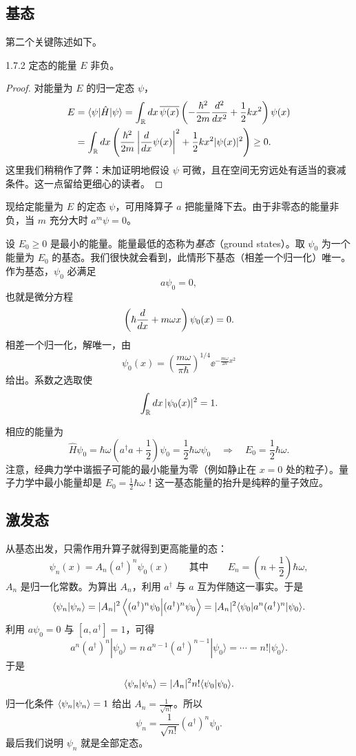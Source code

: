\subsection{基态}

第二个关键陈述如下。

\begin{proposition}{1.7.2}
  定态的能量 $E$ 非负。
\end{proposition}

\begin{proof}
  对能量为 $E$ 的归一定态 $\psi$，
  \[
  \begin{aligned}
  E&=\langle\psi|\hat H|\psi\rangle
  =\int_{\mathbb{R}}d x\,\overline{\psi(x)}
  \left(-\frac{\hbar^2}{2m}\frac{d^2}{d x^2}+\frac12 kx^2\right)\psi(x)\\
  &=\int_{\mathbb{R}}d x\left(
  \frac{\hbar^2}{2m}\left|\frac{d}{d x}\psi(x)\right|^2
  +\frac12 kx^2\lvert \psi(x)\rvert^2\right)\ge 0.
  \end{aligned}
  \]
  这里我们稍稍作了弊：未加证明地假设 $\psi$ 可微，且在空间无穷远处有适当的衰减条件。这一点留给更细心的读者。
\end{proof}

现给定能量为 $E$ 的定态 $\psi$，可用降算子 $a$ 把能量降下去。由于非零态的能量非负，当 $m$ 充分大时 $a^m\psi=0$。

设 $E_0\ge 0$ 是最小的能量。能量最低的态称为\emph{基态}（ground states）。取 $\psi_0$ 为一个能量为 $E_0$ 的基态。我们很快就会看到，此情形下基态（相差一个归一化）唯一。作为基态，$\psi_0$ 必满足
\[
a\psi_0=0,
\]
也就是微分方程
\[
\left(\hbar\frac{d}{d x}+m\omega x\right)\psi_0(x)=0.
\]
相差一个归一化，解唯一，由
\[
\psi_0(x)=\left(\frac{m\omega}{\pi\hbar}\right)^{1/4}\ee^{-\frac{m\omega}{2\hbar}x^2}
\]
给出。系数之选取使
\[
\int_{\mathbb{R}}d x\,\lvert \psi_0(x)\rvert^2=1.
\]

相应的能量为
\[
\hat H\psi_0=\hbar\omega\left(a^\dagger a+\frac12\right)\psi_0
=\frac12\hbar\omega\psi_0
\quad\Longrightarrow\quad
E_0=\frac12\hbar\omega.
\]
注意，经典力学中谐振子可能的最小能量为零（例如静止在 $x=0$ 处的粒子）。量子力学中最小能量却是 $E_0=\frac12\hbar\omega$！这一基态能量的抬升是纯粹的量子效应。

\subsection{激发态}

从基态出发，只需作用升算子就得到更高能量的态：
\[
\psi_n(x)=A_n(a^\dagger)^n\psi_0(x)
\qquad\text{其中}\qquad
E_n=\left(n+\frac12\right)\hbar\omega,
\]
$A_n$ 是归一化常数。为算出 $A_n$，利用 $a^\dagger$ 与 $a$ 互为伴随这一事实。于是
\[
\langle \psi_n|\psi_n\rangle
=\lvert A_n\rvert^2\left\langle(a^\dagger)^n\psi_0\Big|(a^\dagger)^n\psi_0\right\rangle
=\lvert A_n\rvert^2\langle\psi_0|a^n(a^\dagger)^n|\psi_0\rangle.
\]
利用 $a\psi_0=0$ 与 $[a,a^\dagger]=1$，可得
\[
a^n(a^\dagger)^n|\psi_0\rangle
=n\,a^{n-1}(a^\dagger)^{n-1}|\psi_0\rangle
=\cdots=n!|\psi_0\rangle.
\]
于是
\[
\langle \psi_n|\psi_n\rangle=\lvert A_n\rvert^2 n!\langle \psi_0|\psi_0\rangle.
\]
归一化条件 $\langle \psi_n|\psi_n\rangle=1$ 给出 $A_n=\frac{1}{\sqrt{n!}}$。所以
\[
\psi_n=\frac{1}{\sqrt{n!}}(a^\dagger)^n\psi_0.
\]
最后我们说明 $\psi_n$ 就是全部定态。

